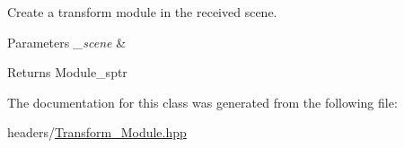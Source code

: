 Create a transform module in the received scene. 


\begin{DoxyParams}{Parameters}
{\em \+\_\+scene} & \\
\hline
\end{DoxyParams}
\begin{DoxyReturn}{Returns}
Module\+\_\+sptr 
\end{DoxyReturn}


The documentation for this class was generated from the following file\+:\begin{DoxyCompactItemize}
\item 
headers/\mbox{\hyperlink{_transform___module_8hpp}{Transform\+\_\+\+Module.\+hpp}}\end{DoxyCompactItemize}
